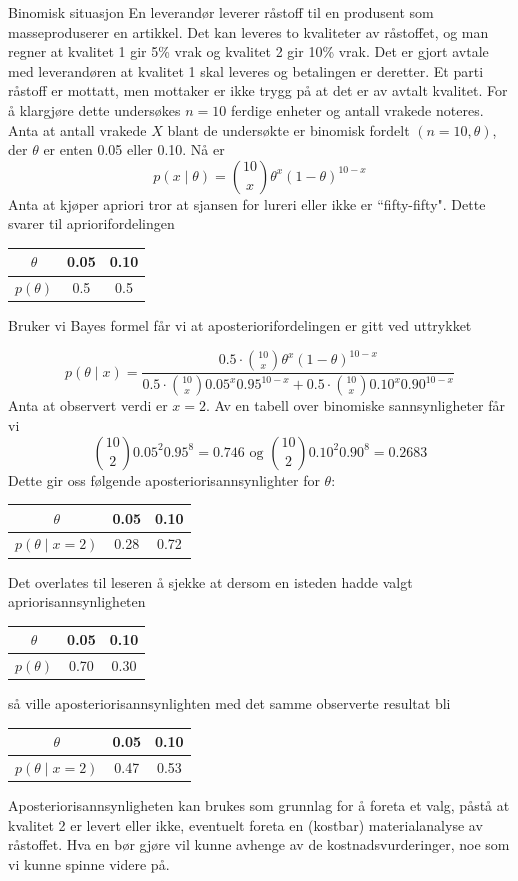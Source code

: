 {{\begin{eksempel}{Binomisk situasjon}
En leverandør leverer råstoff til en produsent som masseproduserer en
artikkel. Det kan leveres to kvaliteter av råstoffet, og man regner at
kvalitet 1 gir 5\% vrak og kvalitet 2 gir 10\% vrak. Det er gjort avtale med
leverandøren at kvalitet 1 skal leveres og betalingen er deretter. Et parti 
råstoff er mottatt, men mottaker er ikke trygg på at det er av avtalt 
kvalitet. For å klargjøre dette undersøkes $n=10$ ferdige enheter og 
antall vrakede noteres. Anta at antall vrakede $X$ blant de undersøkte
er binomisk fordelt $(n=10, \theta)$, der $\theta$ er enten 0.05 eller 0.10.
Nå er
\[ p(x\mid \theta) = {10\choose x} {\theta}^x (1-\theta)^{10-x} \]
Anta at kjøper apriori tror at sjansen for lureri eller ikke er 
``fifty-fifty". Dette svarer til apriorifordelingen
\begin{center}
\begin{tabular}{c|cc}
 $\theta$    & 0.05 & 0.10 \\ \hline
 $p(\theta)$ & 0.5 & 0.5
\end{tabular}
\end{center}
Bruker vi Bayes formel får vi at aposteriorifordelingen er gitt ved uttrykket

\[ p(\theta \mid x) = 
 \frac{0.5 \cdot {10\choose x} {\theta}^x (1-\theta)^{10-x}}
      {0.5 \cdot {10\choose x} {0.05}^x {0.95}^{10-x}+
       0.5 \cdot {10\choose x} {0.10}^x {0.90}^{10-x}} \]
Anta at observert verdi er $x=2$. Av en tabell over binomiske sannsynligheter
får vi
\[   {10\choose 2} {0.05}^2 {0.95}^8 = 0.746 \mbox{\ \ \ \ og \ \ \ } 
     {10\choose 2} {0.10}^2 {0.90}^8 = 0.2683  \]
Dette gir oss følgende aposteriorisannsynlighter for $\theta$:
\begin{center}
\begin{tabular}{c|cc}
 $\theta$  & 0.05 & 0.10 \\ \hline
 $p(\theta\mid x=2)$& 0.28 & 0.72
\end{tabular}
\end{center}
Det overlates til leseren å sjekke at dersom en isteden hadde valgt 
apriori\-sannsynligheten
\begin{center}
\begin{tabular}{c|cc}
 $\theta$  & 0.05 & 0.10 \\ \hline
 $p(\theta)$& 0.70 & 0.30
\end{tabular}
\end{center}
så ville aposteriorisannsynlighten med det samme observerte resultat bli
\begin{center}
\begin{tabular}{c|cc}
 $\theta$  & 0.05 & 0.10 \\ \hline
 $p(\theta\mid x=2)$& 0.47 & 0.53
\end{tabular}
\end{center}
Aposteriorisannsynligheten kan brukes som grunnlag for å foreta et valg,
påstå at kvalitet 2 er levert eller ikke, eventuelt foreta en (kostbar)
material\-analyse av råstoffet. Hva en bør gjøre vil kunne avhenge av
de kostnadsvurderinger, noe som vi kunne spinne videre på.
\end{eksempel}

}}
